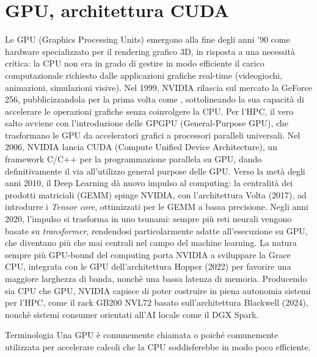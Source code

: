 \chapter{GPU, architettura CUDA}
Le GPU (Graphics Processing Units) emergono alla fine degli anni '90 come hardware specializzato per il rendering grafico 3D, in risposta a una necessità critica: la CPU non era in grado di gestire in modo efficiente il carico computazionale richiesto dalle applicazioni grafiche real-time (videogiochi, animazioni, simulazioni visive).
Nel 1999, NVIDIA rilascia sul mercato la GeForce 256, pubblicizzandola per la prima volta come , sottolineando la sua capacità di accelerare le operazioni grafiche senza coinvolgere la CPU. 
Per l'HPC, il vero salto avviene con l'introduzione delle GPGPU (General-Purpose GPU), che trasformano le GPU da acceleratori grafici a processori paralleli universali.
Nel 2006, NVIDIA lancia CUDA (Compute Unified Device Architecture), un framework C/C++ per la programmazione parallela su GPU, dando definitivamente il via all'utilizzo general purpose delle GPU. 
Verso la metà degli anni 2010, il Deep Learning dà nuovo impulso al computing: la centralità dei prodotti matriciali (GEMM) spinge NVIDIA, con l'architettura Volta (2017), ad introdurre i \emph{Tensor core}, ottimizzati per le GEMM a bassa precisione.
Negli anni 2020, l'impulso si trasforma in uno tsunami: sempre più reti neurali vengono basate su \emph{transformer}, rendendosi particolarmente adatte all'esecuzione su GPU, che diventano più che mai centrali nel campo del machine learning.
La natura sempre più GPU-bound del computing porta NVIDIA a sviluppare la Grace CPU, integrata con le GPU dell'architettura Hopper (2022) per favorire una maggiore larghezza di banda, nonchè una bassa latenza di memoria.
Producendo sia CPU che GPU, NVIDIA capisce di poter costruire in piena autonomia sistemi per l'HPC, come il rack GB200 NVL72 basato sull'architettura Blackwell (2024), nonchè sistemi consumer orientati all'AI locale come il DGX Spark.

\begin{note}{Terminologia}
Una GPU è comunemente chiamata  o  poiché comunemente utilizzata per accelerare calcoli  che la CPU soddisferebbe in modo poco efficiente.
\end{note}

